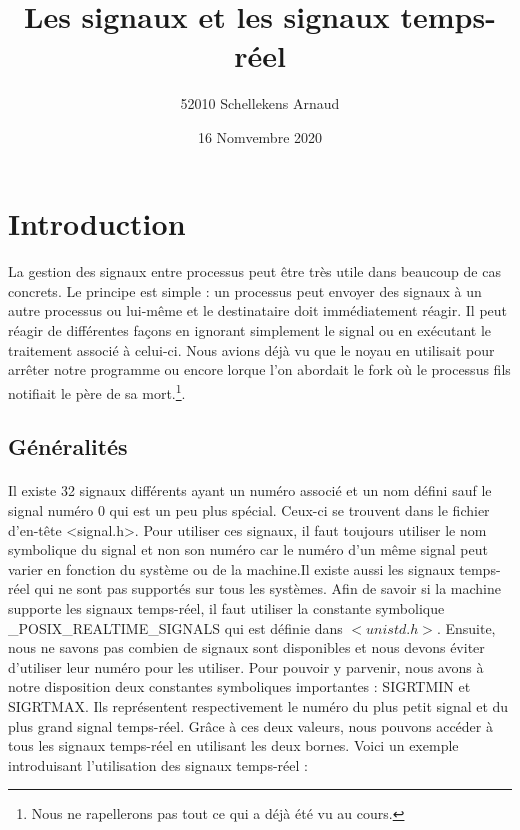 \documentclass{article}
\title{Les signaux et les signaux temps-réel}
\author{52010 Schellekens Arnaud}
\date{16 Nomvembre 2020}
\begin{document}
\maketitle
\newpage

\tableofcontents
\newpage


\section{Introduction}
\paragraph{} La gestion des signaux entre processus peut être très utile dans beaucoup de cas concrets. 
Le principe est simple : un processus peut envoyer des signaux à un autre processus ou lui-même et le destinataire doit immédiatement réagir. 
Il peut réagir de différentes façons en ignorant simplement le signal ou en exécutant le traitement associé à celui-ci.
Nous avions déjà vu que le noyau en utilisait pour arrêter notre programme ou encore lorque l'on abordait le fork où le processus fils notifiait le père de 
sa mort.\footnote{\label{note} Nous ne rapellerons pas tout ce qui a déjà été vu au cours.}.

\subsection{Généralités}
\paragraph{} Il existe 32 signaux différents ayant un numéro associé et un nom défini sauf le signal numéro 0 qui est un
peu plus spécial. Ceux-ci se trouvent dans le fichier d'en-tête <signal.h>.
Pour utiliser ces signaux, il faut toujours utiliser le nom symbolique du signal et non son numéro car le numéro d'un 
même signal peut varier en fonction du système ou de la machine.Il existe aussi les signaux temps-réel qui ne sont pas 
supportés sur tous les systèmes. Afin de savoir si la machine supporte les signaux temps-réel, il faut utiliser 
la constante symbolique \_POSIX\_REALTIME\_SIGNALS qui est définie dans $<unistd.h>$. 
Ensuite, nous ne savons pas combien de signaux sont disponibles et nous devons éviter d'utiliser leur numéro pour les utiliser. 
Pour pouvoir y parvenir, nous avons à notre disposition deux constantes symboliques importantes : SIGRTMIN et SIGRTMAX. 
Ils représentent respectivement le numéro du plus petit signal et du plus grand signal temps-réel. 
Grâce à ces deux valeurs, nous pouvons accéder à tous les signaux temps-réel en utilisant les deux bornes. \linebreak
Voici un exemple introduisant l'utilisation des signaux temps-réel :
\end{document}

